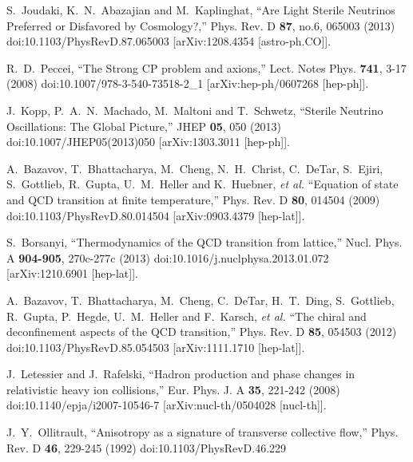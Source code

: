 \documentclass[universe,article,submit,moreauthors,pdftex,a4paper]{Definitions/mdpi}
\begin{document}
\begin{thebibliography}{99}
S.~Joudaki, K.~N.~Abazajian and M.~Kaplinghat,
``Are Light Sterile Neutrinos Preferred or Disfavored by Cosmology?,''
Phys. Rev. D \textbf{87}, no.6, 065003 (2013)
doi:10.1103/PhysRevD.87.065003
[arXiv:1208.4354 [astro-ph.CO]].

R.~D.~Peccei,
``The Strong CP problem and axions,''
Lect. Notes Phys. \textbf{741}, 3-17 (2008)
doi:10.1007/978-3-540-73518-2\_1
[arXiv:hep-ph/0607268 [hep-ph]].

J.~Kopp, P.~A.~N.~Machado, M.~Maltoni and T.~Schwetz,
``Sterile Neutrino Oscillations: The Global Picture,''
JHEP \textbf{05}, 050 (2013)
doi:10.1007/JHEP05(2013)050
[arXiv:1303.3011 [hep-ph]].

A.~Bazavov, T.~Bhattacharya, M.~Cheng, N.~H.~Christ, C.~DeTar, S.~Ejiri, S.~Gottlieb, R.~Gupta, U.~M.~Heller and K.~Huebner, \textit{et al.}
``Equation of state and QCD transition at finite temperature,''
Phys. Rev. D \textbf{80}, 014504 (2009)
doi:10.1103/PhysRevD.80.014504
[arXiv:0903.4379 [hep-lat]].

S.~Borsanyi,
``Thermodynamics of the QCD transition from lattice,''
Nucl. Phys. A \textbf{904-905}, 270c-277c (2013)
doi:10.1016/j.nuclphysa.2013.01.072
[arXiv:1210.6901 [hep-lat]].

A.~Bazavov, T.~Bhattacharya, M.~Cheng, C.~DeTar, H.~T.~Ding, S.~Gottlieb, R.~Gupta, P.~Hegde, U.~M.~Heller and F.~Karsch, \textit{et al.}
``The chiral and deconfinement aspects of the QCD transition,''
Phys. Rev. D \textbf{85}, 054503 (2012)
doi:10.1103/PhysRevD.85.054503
[arXiv:1111.1710 [hep-lat]].

J.~Letessier and J.~Rafelski,
``Hadron production and phase changes in relativistic heavy ion collisions,''
Eur. Phys. J. A \textbf{35}, 221-242 (2008)
doi:10.1140/epja/i2007-10546-7
[arXiv:nucl-th/0504028 [nucl-th]].

J.~Y.~Ollitrault,
``Anisotropy as a signature of transverse collective flow,''
Phys. Rev. D \textbf{46}, 229-245 (1992)
doi:10.1103/PhysRevD.46.229


\end{thebibliography}
\end{document}
